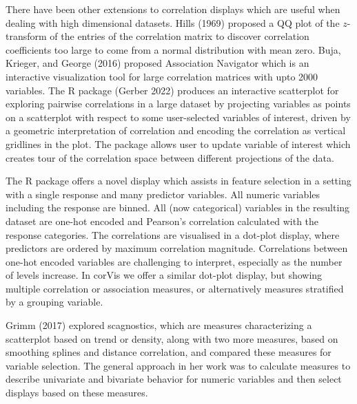 There have been other extensions to correlation displays which are useful when dealing with high dimensional datasets.
Hills (1969) proposed a QQ plot of the \(z\)-transform of the entries of the correlation matrix to discover correlation coefficients too large to come from a normal distribution with mean zero. Buja, Krieger, and George (2016) proposed Association Navigator which is an interactive visualization tool for large correlation matrices with upto 2000 variables. The R package  (Gerber 2022) produces an interactive scatterplot for exploring pairwise correlations in a large dataset by projecting variables as points on a scatterplot with respect to some user-selected variables of interest, driven by a geometric interpretation of correlation and encoding the correlation as vertical gridlines in the plot. The package allows user to update variable of interest which creates tour of the correlation space between different projections of the data.

The R package  offers a novel display which assists in feature selection in a setting with a single response and many predictor variables. All numeric variables including the response are binned. All (now categorical) variables in the resulting dataset are one-hot encoded and Pearson's correlation calculated with the response categories. The correlations are visualised in a dot-plot display, where predictors are ordered by maximum correlation magnitude. Correlations between one-hot encoded variables are challenging to interpret, especially as the number of levels increase. In corVis we offer a similar dot-plot display, but showing multiple correlation or association measures, or alternatively measures stratified by a grouping variable.

Grimm (2017) explored scagnostics, which are measures characterizing a scatterplot based on trend or density, along with two more measures, based on smoothing splines and distance correlation, and compared these measures for variable selection. The general approach in her work was to calculate measures to describe univariate and bivariate behavior for numeric variables and then select displays based on these measures.

